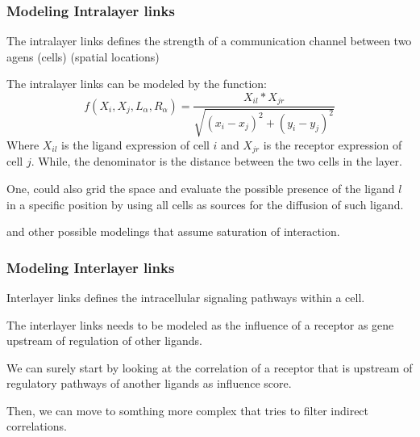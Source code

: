 \documentclass[10pt]{beamer}
\begin{document}
\begin{frame}
    \frametitle{Modeling Intralayer links}
    The intralayer links defines the strength of a communication channel between two agens (cells) (spatial locations)
    \begin{block}{}
        The intralayer links can be modeled by the function:
        \begin{equation}
            f(X_i,X_j,L_\alpha, R_\alpha) = \frac{X_{il} * X_{jr}}{\sqrt{(x_i - x_j)^2 + (y_i - y_j)^2}} 
        \end{equation}
        Where $X_{il}$ is the ligand expression of cell $i$ and $X_{jr}$ is the receptor expression of cell $j$. While,
        the denominator is the distance between the two cells in the layer.
        
        One, could also grid the space and evaluate the possible presence of the ligand $l$ in a specific position by using all cells
        as sources for the diffusion of such ligand.

        and other possible modelings that assume saturation of interaction.
    \end{block}
\end{frame}
\begin{frame}
    \frametitle{Modeling Interlayer links}
    Interlayer links defines the intracellular signaling pathways within a cell.
    \begin{block}{}
        The interlayer links needs to be modeled as the influence of a receptor as gene upstream of regulation of other ligands.

        We can surely start by looking at the correlation of a receptor that is upstream of regulatory pathways of another ligands
        as influence score.

        Then, we can move to somthing more complex that tries to filter indirect correlations.
    \end{block}
\end{frame}
\end{document}
